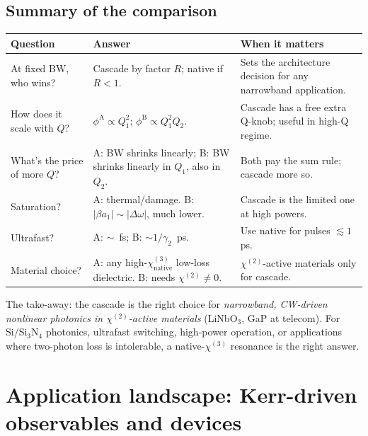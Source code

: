 \documentclass[11pt,a4paper]{article}
\newcommand{\chitwo}{\chi^{(2)}}
\newcommand{\chithree}{\chi^{(3)}}
\newcommand{\Dom}{\Delta\omega}
\begin{document}
\subsection*{Summary of the comparison}

\begin{center}
\begin{tabular}{p{}p{}p{}}
\toprule
Question & Answer & When it matters \\
\midrule
At fixed BW, who wins? &
Cascade by factor $R$; native if $R<1$. &
Sets the architecture decision for any narrowband application. \\

How does it scale with $Q$? &
$\phi^\text{A}\!\propto\!Q_1^{2}$; $\phi^\text{B}\!\propto\!Q_1^{2}Q_2$. &
Cascade has a free extra Q-knob; useful in high-Q regime. \\

What's the price of more $Q$? &
A: BW shrinks linearly; B: BW shrinks linearly in $Q_1$, also in $Q_2$. &
Both pay the sum rule; cascade more so. \\

Saturation? &
A: thermal/damage. B: $|\beta a_1|\sim|\Dom|$, much lower. &
Cascade is the limited one at high powers. \\

Ultrafast? &
A: $\sim$~fs; B: $\sim 1/\gamma_2$~ps. &
Use native for pulses $\lesssim 1$ ps. \\

Material choice? &
A: any high-$\chithree_\text{native}$ low-loss dielectric. B: needs $\chitwo\neq 0$. &
$\chitwo$-active materials only for cascade. \\
\bottomrule
\end{tabular}
\end{center}

\noindent
The take-away: the cascade is the right choice for \emph{narrowband,
CW-driven nonlinear photonics in $\chitwo$-active materials} (LiNbO$_3$,
GaP at telecom).  For Si/Si$_3$N$_4$ photonics, ultrafast switching,
high-power operation, or applications where two-photon loss is
intolerable, a native-$\chithree$ resonance is the right answer.

\section{Application landscape: Kerr-driven observables and devices}\label{sec:applications}
\end{document}
